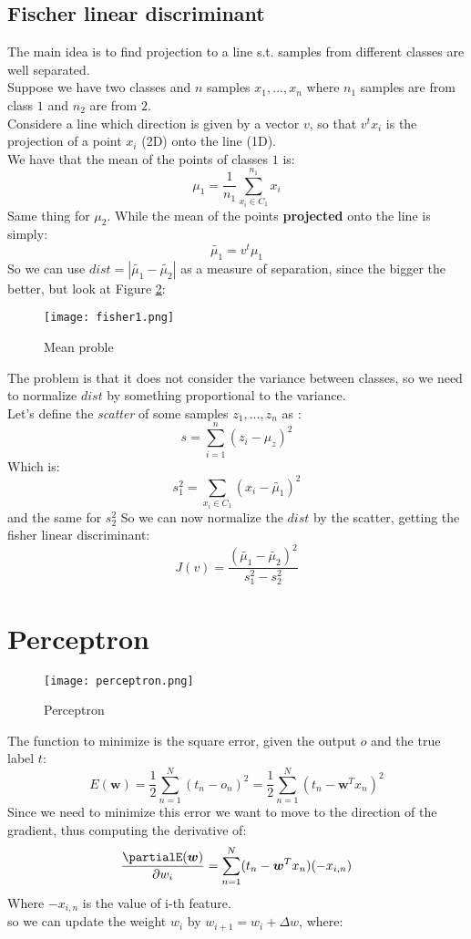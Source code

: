 \subsection{Fischer linear discriminant}
The main idea is to find projection to a line s.t. samples from different classes are well separated.\\
Suppose we have two classes and $n$ samples $x_1,...,x_n$ where $n_1$ samples are from class $1$ and $n_2$ are from $2$.\\
Considere a line which direction is given by a vector $v$, so that $v^tx_i$ is the projection of a point $x_i$ (2D) onto the line (1D).\\
We have that the mean of the points of classes $1$ is:
\[\mu_1=\frac{1}{n_1}\sum_{x_i \in C_1}^{n_1}x_i\]
Same thing for $\mu_2$. While the mean of the points \textbf{projected} onto the line is simply:
\[\tilde{\mu_1}=v^t\mu_1\]
So we can use $dist=|\tilde{\mu_1} -\tilde{\mu_2}|$ as a measure of separation, since the bigger the better, but look at Figure \ref{fig:fisher1}:

\begin{figure}[H]
\texttt{[image: fisher1.png]}
\caption{Mean proble}
\label{fig:fisher1}
\end{figure}

The problem is that it does not consider the variance between classes, so we need to normalize $dist$ by something proportional to the variance.\\
Let's define the \textit{scatter} of some samples $z_1,...,z_n$ as :
\[s=\sum_{i=1}^n(z_i-\mu_z)^2\]
Which is:
\[s_1^2=\sum_{x_i \in C_1}(x_i-\tilde{\mu_1})^2\]
and the same for $s_2^2$
So we can now normalize the $dist$ by the scatter, getting the fisher linear discriminant:
\[J(v)=\frac{(\tilde{\mu_1}-\tilde{\mu_2})^2}{s_1^2-s_2^2}\]

\section{Perceptron}

\begin{figure}[H]
\texttt{[image: perceptron.png]}
\caption{Perceptron}
\label{fig:fisher1}
\end{figure}

The function to minimize is the square error, given the output $o$ and the true label $t$:
\[E(\bm{w})=\frac{1}{2}\sum_{n=1}^N(t_n-o_n)^2=\frac{1}{2}\sum_{n=1}^N(t_n -\bm{w}^Tx_n)^2\]
Since we need to minimize this error we want to move to the direction of the gradient, thus computing the derivative of:
\[\frac{\partialE(\bm{w}) }{\partial w_i}=\sum_{n=1}^N(t_n-\bm{w}^Tx_n)(-x_{i,n})\]
Where $-x_{i,n}$ is the value of i-th feature.\\
so we can update the weight $w_i$ by $w_{i+1}=w_i + \Delta w$, where:

